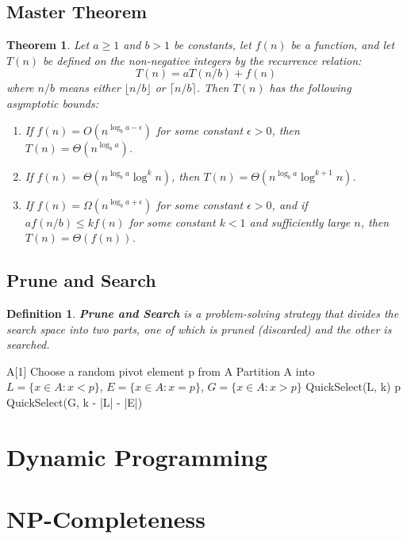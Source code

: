 \documentclass[11pt,fleqn]{article}
\newtheorem*{theorem}{Theorem}
\newtheorem*{definition}{Definition}
\begin{document}
\subsection{Master Theorem}
\begin{theorem}
    Let $a \geq 1$ and $b > 1$ be constants, let $f(n)$ be a function, and let $T(n)$ be defined on the non-negative integers by the recurrence relation: \[
        T(n) = aT(n/b) + f(n)
    \]
    where $n/b$ means either $\lfloor n/b \rfloor$ or $\lceil n/b \rceil$. Then $T(n)$ has the following asymptotic bounds: \begin{enumerate}
        \item If $f(n) = O(n^{\log_b a - \epsilon})$ for some constant $\epsilon > 0$, then $T(n) = \Theta(n^{\log_b a})$.
        \item If $f(n) = \Theta(n^{\log_b a} \log^k n)$, then $T(n) = \Theta(n^{\log_b a} \log^{k+1} n)$.
        \item If $f(n) = \Omega(n^{\log_b a + \epsilon})$ for some constant $\epsilon > 0$, and if $a f(n/b) \leq k f(n)$ for some constant $k < 1$ and sufficiently large $n$, then $T(n) = \Theta(f(n))$.
    \end{enumerate}
\end{theorem}

\subsection{Prune and Search}

\begin{definition}
    \textbf{Prune and Search} is a problem-solving strategy that divides the search space into two parts, one of which is pruned (discarded) and the other is searched.
\end{definition}

\begin{algorithmic}
     
        \State \Return A[1]
    \EndIf
    \State Choose a random pivot element p from A
    \State Partition A into $L = \{x \in A : x < p\}$, $E = \{x \in A : x = p\}$, $G = \{x \in A : x > p\}$
        \State \Return QuickSelect(L, k)
        \State \Return p
    \Else
        \State \Return QuickSelect(G, k - |L| - |E|)
    \EndIf
    \EndFunction
\end{algorithmic}




\section{Dynamic Programming}


\section{NP-Completeness}
\end{document}
